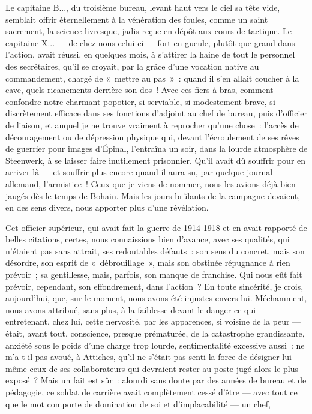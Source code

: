 \documentclass[french,twoside]{book} %
\begin{document}
Le capitaine B..., du troisième bureau, levant haut vers le ciel sa tête vide, semblait offrir éternellement à la vénération des foules, comme un saint sacrement, la science livresque, jadis reçue en dépôt aux cours de tactique. Le capitaine X... — de chez nous celui-ci — fort en gueule, plutôt que grand dans l’action, avait réussi, en quelques mois, à s’attirer la haine de tout le personnel des secrétaires, qu’il se croyait, par la grâce d’une vocation native au commandement, chargé de « mettre au pas » : quand il s’en allait coucher à la cave, quels ricanements derrière son dos ! Avec ces fiers-à-bras, comment confondre notre charmant popotier, si serviable, si modestement brave, si discrètement efficace dans ses fonctions d’adjoint au chef de bureau, puis d’officier de liaison, et auquel je ne trouve vraiment à reprocher qu’une chose : l’accès de découragement ou de dépression physique qui, devant l’écroulement   de ses rêves de guerrier pour images d’Épinal, l’entraîna un soir, dans la lourde atmosphère de Steenwerk, à se laisser faire inutilement prisonnier. Qu’il avait dû souffrir pour en arriver là — et souffrir plus encore quand il aura su, par quelque journal allemand, l’armistice ! Ceux que je viens de nommer, nous les avions déjà bien jaugés dès le temps de Bohain. Mais les jours brûlants de la campagne devaient, en des sens divers, nous apporter plus d’une révélation.\par
Cet officier supérieur, qui avait fait la guerre de 1914-1918 et en avait rapporté de belles citations, certes, nous connaissions bien d’avance, avec ses qualités, qui n’étaient pas sans attrait, ses redoutables défauts : son sens du concret, mais son désordre, son esprit de « débrouillage », mais son obstinée répugnance à rien prévoir ; sa gentillesse, mais, parfois, son manque de franchise. Qui nous eût fait prévoir, cependant, son effondrement, dans l’action ? En toute sincérité, je crois, aujourd’hui, que, sur le moment, nous avons été injustes envers lui. Méchamment, nous avons attribué, sans plus, à la faiblesse devant le danger ce qui — entretenant, chez lui, cette nervosité, par les apparences, si voisine de la peur — était, avant tout, conscience, presque prématurée, de la catastrophe grandissante, anxiété sous le poids d’une charge trop lourde, sentimentalité excessive aussi : ne m’a-t-il pas avoué, à Attiches, qu’il ne s’était pas senti la force de désigner lui-même ceux de ses collaborateurs qui devraient rester au poste jugé alors le plus exposé ? Mais un fait est sûr : alourdi sans doute par des années de bureau et de pédagogie, ce soldat de carrière avait complètement cessé d’être — avec tout ce que le mot comporte de domination de soi et d’implacabilité — un chef,\par
\end{document}
